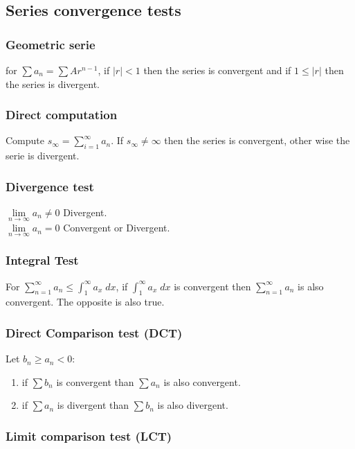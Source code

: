 \documentclass[5pt]{article}
\begin{document}
\begin{multicols}{2}
\subsection{Series convergence tests}

\subsubsection{Geometric serie}
for $\sum a_n=\sum A r^{n-1}$, if $|r|<1$ then the series is convergent and if $1\le |r|$ then the series is divergent.


\subsubsection{Direct computation}
Compute $s_\infty=\sum^\infty_{i=1} a_n$. If $s_\infty\neq \infty$ then the series is convergent, other wise the serie is divergent.


\subsubsection{Divergence test}
\(\lim\limits_{n\to\infty} a_n \neq 0\) Divergent.\\
\(\lim\limits_{n\to\infty} a_n = 0 \) Convergent or Divergent.\\

\subsubsection{Integral Test}
For $\sum^\infty_{n=1} a_n \le \int^\infty_1 a_x\;dx $, if $\int^\infty_1 a_x\;dx$ is convergent then $\sum^\infty_{n=1} a_n$ is also convergent. The opposite is also true.


\subsubsection{Direct Comparison test (DCT)}
Let $b_n\geq a_n < 0$:
\begin{enumerate}
    \item if $\sum b_n$ is convergent than $\sum a_n$ is also convergent.
    \item if $\sum a_n$ is divergent than $\sum b_n$ is also divergent.
\end{enumerate}

\subsubsection{Limit comparison test (LCT)}




\end{multicols}
\end{document}
